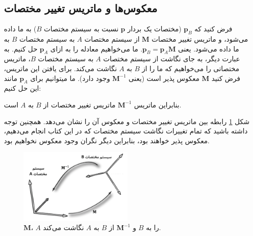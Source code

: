 \subsection{\textbf{معکوس‌ها و ماتریس تغییر‌ مختصات}}
\label{subsec:3.4.5}
{
    \Large
    \begin{spacing}{1.5}
        فرض کنید که $\textbf{p}_{B}$ (مختصات یک بردار $\textbf{p}$ نسبت به سیستم مختصات $B$) به ما داده می‌شود، و ماتریس تغییر مختصات $\textbf{M}$ از سیستم مختصات $A$ به سیستم مختصات $B$ به ما داده می‌شود.
        یعنی $\textbf{p}_{B}=\textbf{p}_{A}\textbf{M}$. ما می‌خواهیم معادله را به ازای $\textbf{p}_{A}$ حل کنیم.
        به عبارت دیگر، به جای نگاشت از سیستم مختصات $A$ به سیستم مختصات $B$، ماتریس مختصاتی را می‌خواهیم که ما را از $B$ به $A$ نگاشت می‌کند.
        برای یافتن این ماتریس، فرض کنید $\textbf{M}$ معکوس پذیر است (یعنی $\textbf{M}^{-1}$ وجود دارد). ما میتوانیم برای $\textbf{p}_{A}$ مانند این حل کنیم:

        \begin{flushleft}
        \end{flushleft}

        بنابراین ماتریس $\textbf{M}^{-1}$ ماتریس تغییر مختصات از $B$ به $A$ است.

        شکل \ref{fig:4.Session.1.3.13} رابطه بین ماتریس تغییر مختصات و معکوس آن را نشان می‌دهد.
        همچنین توجه داشته باشید که تمام تغییرات نگاشت سیستم مختصات که در این کتاب انجام می‌دهیم، معکوس پذیر خواهند بود، بنابراین دیگر نگران وجود معکوس نخواهیم بود.

        \begin{figure}[H]
            \centering
            \setlength{\belowcaptionskip}{-10pt}
            \includegraphics[width=0.5\textwidth]{Images/4/3/4.Session.1.3.13}
            \caption {$\textbf{M}$، $A$ را به $B$ و $\textbf{M}^{-1}$ از $B$ به $A$ نگاشت می‌کند.}
            \label{fig:4.Session.1.3.13}
        \end{figure}


\end{spacing}}
